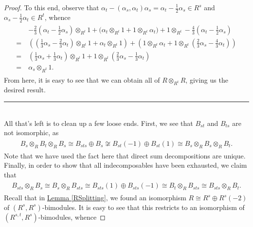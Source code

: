 \begin{proof}
\noindent To this end, observe that $\alpha_t - (\alpha_s, \alpha_t)\alpha_s = \alpha_t - \frac{1}{2}\alpha_s \in R^s$ and $\alpha_s - \frac{1}{2}\alpha_t \in R^t$, whence
\begin{align*}
\begin{split}
&-\frac{2}{3}\left(\alpha_t - \frac{1}{2}\alpha_s\right) \otimes_{R^t} 1 + \bigg(\alpha_t \otimes_{R^t} 1 + 1 \otimes_{R^t} \alpha_t\bigg) + 1 \otimes_{R^t} -\frac{4}{3}\left(\alpha_t - \frac{1}{2}\alpha_s\right)\\
=\ &\left(\left(\frac{1}{3}\alpha_s - \frac{2}{3}\alpha_t\right) \otimes_{R^t} 1 + \alpha_t \otimes_{R^t} 1\right) + \left(1 \otimes_{R^t} \alpha_t + 1 \otimes_{R^t} \left(\frac{2}{3}\alpha_s - \frac{4}{3}\alpha_t\right)\right)\\
=\ &\left(\frac{1}{3}\alpha_s + \frac{1}{3}\alpha_t\right) \otimes_{R^t} 1 + 1 \otimes_{R^t} \left(\frac{2}{3}\alpha_s - \frac{1}{3}\alpha_t\right)\\
=\ &\alpha_s \otimes_{R^t} 1.
\end{split}
\end{align*}
\noindent From here, it is easy to see that we can obtain all of $R \otimes_{R^t} R$, giving us the desired result.\\[-1.5\baselineskip]
\begin{center}
\rule{0.5\linewidth}{1pt}
\end{center}
\noindent\\[-\baselineskip] All that's left is to clean up a few loose ends. First, we see that $B_{st}$ and $B_{ts}$ are not isomorphic, as
\begin{align*}
\begin{split}
B_s \otimes_R B_t \otimes_R B_s \cong B_{sts} \oplus B_s \not\cong B_{st}(-1) \oplus B_{st}(1) \cong B_s \otimes_R B_s \otimes_R B_t.
\end{split}
\end{align*}
\noindent Note that we have used the fact here that direct sum decompositions are unique. Finally, in order to show that all indecomposables have been exhausted, we claim that
\begin{align*}
\begin{split}
B_{sts} \otimes_R B_s \cong B_s \otimes_R B_{sts} \cong B_{sts}(1) \oplus B_{sts}(-1) \cong B_t \otimes_R B_{sts} \cong B_{sts} \otimes_R B_t.
\end{split}
\end{align*}
\noindent Recall that in \hyperref[RSplitting]{Lemma \ref*{RSplitting}}, we found an isomorphism $R \cong R^s \oplus R^s(-2)$ of $(R^s, R^s)$-bimodules. It is easy to see that this restricts to an isomorphism of $(R^{s,t}, R^s)$-bimodules, whence

\end{proof}
